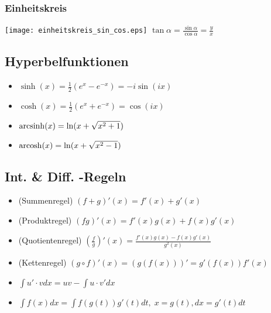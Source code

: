 \subsubsection{Einheitskreis}
\texttt{[image: einheitskreis\_sin\_cos.eps]}
$\tan \alpha = \frac{\sin \alpha}{\cos \alpha} = \frac{y}{x}$


\subsection{Hyperbelfunktionen}
\begin{itemize}[leftmargin=*]
	\item $\sinh(x) = \frac{1}{2}(e^x - e^{-x}) = -i \sin(ix)$
	\item $\cosh(x) = \frac{1}{2}(e^x + e^{-x}) = \cos(ix)$
	\item $\operatorname{arcsinh}(x) = \ln(x + \sqrt{x^2 + 1})$
	\item $\operatorname{arcosh}(x) = \ln(x + \sqrt{x^2 - 1})$
\end{itemize}

\subsection{Int. \& Diff. -Regeln}
\begin{itemize}[leftmargin=*]
	\item (Summenregel) $(f + g)'(x) = f'(x) + g'(x)$
	\item (Produktregel) $(fg)'(x) = f'(x)g(x) + f(x)g'(x)$
	\item (Quotientenregel) $(\frac{f}{g})'(x) = \frac{f'(x)g(x) -
	f(x)g'(x)}{g^2(x)}$
	\item (Kettenregel) $(g \circ f)'(x) = (g(f(x)))' = g'(f(x)) f'(x)$
	\item $\int u'\cdot v dx = uv - \int u \cdot v' dx$
	\item $\int f(x) dx = \int f(g(t)) g'(t) dt, \; x=g(t), dx = g'(t) dt$
\end{itemize}

